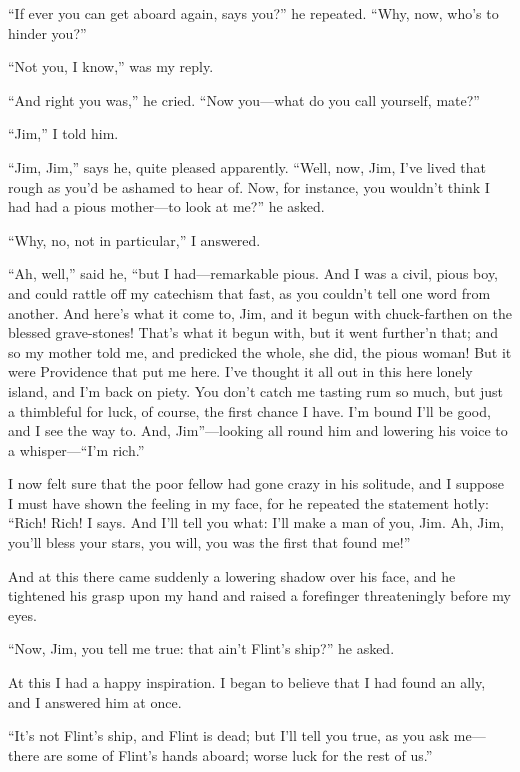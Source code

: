 \enquote{If ever you can get aboard again, says you?} he repeated. \enquote{Why, now, who’s to hinder you?}

\enquote{Not you, I know,} was my reply.

\enquote{And right you was,} he cried. \enquote{Now you---what do you call yourself, mate?}

\enquote{Jim,} I told him.

\enquote{Jim, Jim,} says he, quite pleased apparently. \enquote{Well, now, Jim, I’ve lived that rough as you’d be ashamed to hear of. Now, for instance, you wouldn’t think I had had a pious mother---to look at me?} he asked.

\enquote{Why, no, not in particular,} I answered.

\enquote{Ah, well,} said he, \enquote{but I had---remarkable pious. And I was a civil, pious boy, and could rattle off my catechism that fast, as you couldn’t tell one word from another. And here’s what it come to, Jim, and it begun with chuck-farthen on the blessed grave-stones! That’s what it begun with, but it went further’n that; and so my mother told me, and predicked the whole, she did, the pious woman! But it were Providence that put me here. I’ve thought it all out in this here lonely island, and I’m back on piety. You don’t catch me tasting rum so much, but just a thimbleful for luck, of course, the first chance I have. I’m bound I’ll be good, and I see the way to. And, Jim}---looking all round him and lowering his voice to a whisper---\enquote{I’m rich.}

I now felt sure that the poor fellow had gone crazy in his solitude, and I suppose I must have shown the feeling in my face, for he repeated the statement hotly: \enquote{Rich! Rich! I says. And I’ll tell you what: I’ll make a man of you, Jim. Ah, Jim, you’ll bless your stars, you will, you was the first that found me!}

And at this there came suddenly a lowering shadow over his face, and he tightened his grasp upon my hand and raised a forefinger threateningly before my eyes.

\enquote{Now, Jim, you tell me true: that ain’t Flint’s ship?} he asked.

At this I had a happy inspiration. I began to believe that I had found an ally, and I answered him at once.

\enquote{It’s not Flint’s ship, and Flint is dead; but I’ll tell you true, as you ask me---there are some of Flint’s hands aboard; worse luck for the rest of us.}

